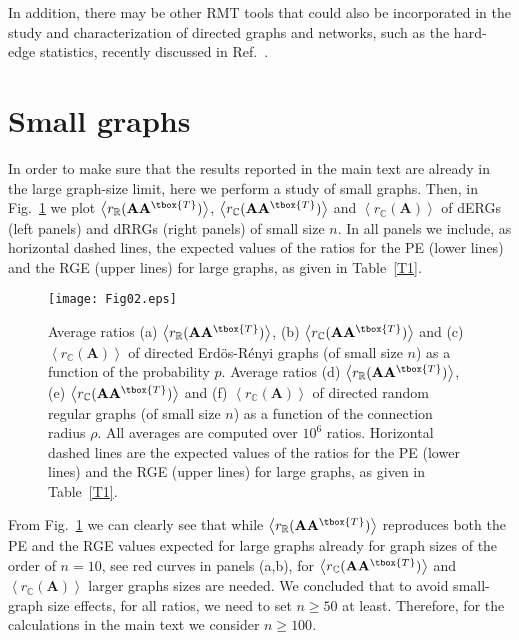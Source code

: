 In addition, there may be other RMT tools that could also be incorporated in the study and characterization 
of directed graphs and networks, such as the hard-edge statistics, recently discussed in Ref.~\cite{XSK24}.




\appendix 

\section{Small graphs}
\label{appex}

In order to make sure that the results reported in the main text are already in the 
large graph-size limit, here we perform a study of small graphs.
Then, in Fig.~\ref{Fig02} we plot 
$\left\langle r_\mathbb{R}(\mathbf{A}\mathbf{A}^{\tbox{T}}) \right\rangle$,  
$\left\langle r_\mathbb{C}(\mathbf{A}\mathbf{A}^{\tbox{T}}) \right\rangle$ and
$\left\langle r_\mathbb{C}(\mathbf{A}) \right\rangle$ of 
dERGs (left panels) and dRRGs (right panels) of small size $n$.
In all panels we include, as horizontal dashed lines, the expected values of the ratios for the PE 
(lower lines) and the RGE (upper lines) for large graphs, as given in Table~\ref{T1}.


\begin{figure}[ht]
\centering
\texttt{[image: Fig02.eps]}
\caption{Average ratios 
(a) $\left\langle r_\mathbb{R}(\mathbf{A}\mathbf{A}^{\tbox{T}}) \right\rangle$, 
(b) $\left\langle r_\mathbb{C}(\mathbf{A}\mathbf{A}^{\tbox{T}}) \right\rangle$ and
(c) $\left\langle r_\mathbb{C}(\mathbf{A}) \right\rangle$
of directed Erd\"os-R\'enyi graphs (of small size $n$) as a function of the probability $p$.
Average ratios 
(d) $\left\langle r_\mathbb{R}(\mathbf{A}\mathbf{A}^{\tbox{T}}) \right\rangle$,  
(e) $\left\langle r_\mathbb{C}(\mathbf{A}\mathbf{A}^{\tbox{T}}) \right\rangle$ and
(f) $\left\langle r_\mathbb{C}(\mathbf{A}) \right\rangle$
of directed random regular graphs (of small size $n$) as a function of the connection radius $\rho$.
All averages are computed over $10^6$ ratios.
Horizontal dashed lines are the expected values of the ratios for the PE (lower lines) and
the RGE (upper lines) for large graphs, as given in Table~\ref{T1}.}
\label{Fig02}
\end{figure}

From Fig.~\ref{Fig02} we can clearly see that while 
$\left\langle r_\mathbb{R}(\mathbf{A}\mathbf{A}^{\tbox{T}}) \right\rangle$ reproduces both the
PE and the RGE values expected for large graphs already for graph sizes of the order of $n=10$,
see red curves in panels (a,b), for $\left\langle r_\mathbb{C}(\mathbf{A}\mathbf{A}^{\tbox{T}}) \right\rangle$ 
and $\left\langle r_\mathbb{C}(\mathbf{A}) \right\rangle$ larger graphs sizes are needed.
We concluded that to avoid small-graph size effects, for all ratios, we need to set $n\ge 50$ at least.
Therefore, for the calculations in the main text we consider $n\ge 100$.



